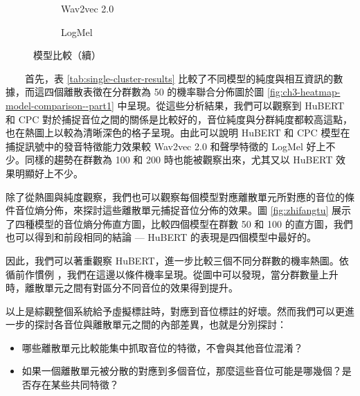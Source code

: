 {{\begin{figure}
          \begin{subfigure}{\textwidth}  %
         \centering
         \caption{Wav2vec 2.0}
         \label{fig:ch3-heatmap-model--w2v2-50-joint-byprob}
     \end{subfigure}
     
     \vfill
     \begin{subfigure}{\textwidth}  %
         \centering
         \caption{LogMel}
         \label{fig:ch3-heatmap-model--logmel-50-joint-byprob}
     \end{subfigure}
     \caption{模型比較（續）}
     \label{fig:ch3-heatmap-model-comparison--part2}
\end{figure}

}


　　首先，表 \ref{tab:single-cluster-results} 比較了不同模型的純度與相互資訊的數據，而這四個離散表徵在分群數為 50 的機率聯合分佈圖於圖 \ref{fig:ch3-heatmap-model-comparison--part1} 中呈現。從這些分析結果，我們可以觀察到 HuBERT 和 CPC 對於捕捉音位之間的關係是比較好的，音位純度與分群純度都較高這點，也在熱圖上以較為清晰深色的格子呈現。由此可以說明 HuBERT 和 CPC 模型在捕捉訊號中的發音特徵能力效果較 Wav2vec 2.0 和聲學特徵的 LogMel 好上不少。同樣的趨勢在群數為 100 和 200 時也能被觀察出來，尤其又以 HuBERT 效果明顯好上不少。

        除了從熱圖與純度觀察，我們也可以觀察每個模型對應離散單元所對應的音位的條件音位熵分佈，來探討這些離散單元捕捉音位分佈的效果。圖 \ref{fig:zhifangtu} 展示了四種模型的音位熵分佈直方圖，比較四個模型在群數 50 和 100 的直方圖，我們也可以得到和前段相同的結論 --- HuBERT 的表現是四個模型中最好的。

        因此，我們可以著重觀察 HuBERT，進一步比較三個不同分群數的機率熱圖。依循前作慣例 \cite{wells_phonetic_2022, zhang2024speechtokenizer, liu2024dinosr} ，我們在這邊以條件機率呈現。從圖中可以發現，當分群數量上升時，離散單元之間有對區分不同音位的效果得到提升。



        以上是綜觀整個系統給予虛擬標註時，對應到音位標註的好壞。然而我們可以更進一步的探討各音位與離散單元之間的內部差異，也就是分別探討：
\begin{itemize}
    \item 哪些離散單元比較能集中抓取音位的特徵，不會與其他音位混淆？
    \item 如果一個離散單元被分散的對應到多個音位，那麼這些音位可能是哪幾個？是否存在某些共同特徵？
\end{itemize}

}

